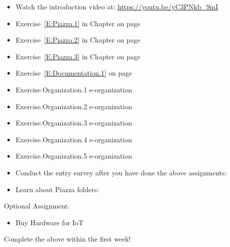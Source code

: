 \begin{itemize}\renewcommand{\labelitemi}{\scriptsize$\square$}
\item  Watch the introduction video at:
  \url{https://youtu.be/yC3PNkb_9mI}

\item Exercise~\ref{E:Piazza.1} in Chapter  on page \pageref{E:Piazza.1}
\item Exercise~\ref{E:Piazza.2} in Chapter  on page \pageref{E:Piazza.2}
\item Exercise~\ref{E:Piazza.3} in Chapter  on page \pageref{E:Piazza.3}
\item Exercise~\ref{E:Documentation.1} on page \pageref{E:Documentation.1}

\item Exercise.Organization.1 e-organization
\item Exercise.Organization.2 e-organization
\item Exercise.Organization.3 e-organization
\item Exercise.Organization.4 e-organization
\item Exercise.Organization.5 e-organization
\item 
  Conduct the entry survey after you have done the above assignments:

\item 
  Learn about Piazza folders:
\end{itemize}

Optional Assignment:

\begin{itemize}
\item Buy Hardware for IoT
\end{itemize}

Complete the above within the first week!

